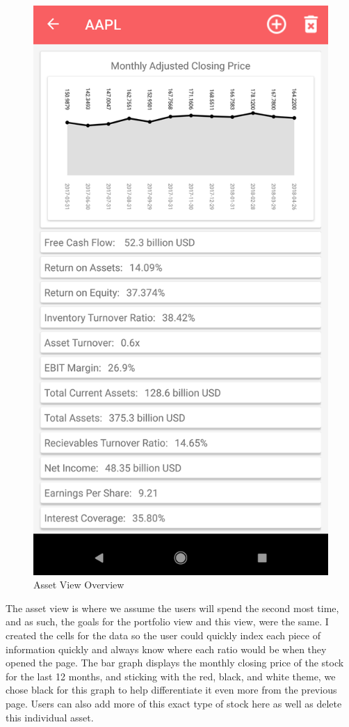 \documentclass[letterpaper,10pt,titlepage,journal,compsoc,draftclsnofoot,onecolumn]{IEEEtran}
\begin{document}
\begin{figure}[h]
   \caption{Asset View Overview}
   \centering
   \includegraphics[scale=.65]{spring_asset_screenshot}
\end{figure}

The asset view is where we assume the users will spend the second most time, and as such, the goals for the portfolio view and this view, were the same. I created the cells for the data so the user could quickly index each piece of information quickly and always know where each ratio would be when they opened the page. The bar graph displays the monthly closing price of the stock for the last 12 months, and sticking with the red, black, and white theme, we chose black for this graph to help differentiate it even more from the previous page. Users can also add more of this exact type of stock here as well as delete this individual asset.
\end{document}
